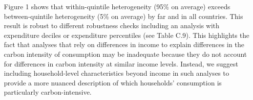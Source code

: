 \documentclass[11pt]{article}
\begin{document}
\begin{revisionbox}

Figure 1 shows that within-quintile heterogeneity (95\% on average) exceeds between-quintile heterogeneity (5\% on average) by far and in all countries. This result is robust to different robustness checks including an analysis with expenditure deciles or expenditure percentiles (see Table C.9). This highlights the fact that analyses that rely on differences in income to explain differences in the carbon intensity of consumption may be inadequate because they do not account for differences in carbon intensity at similar income levels. Instead, we suggest including household-level characteristics beyond income in such analyses to provide a more nuanced description of which households' consumption is particularly carbon-intensive.
\end{revisionbox}
\end{document}
